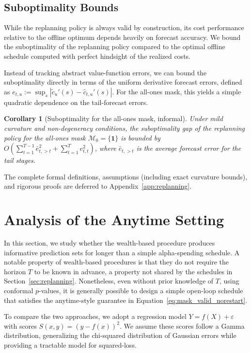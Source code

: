 \documentclass{uai2026} %
\newtheorem{corollary}[theorem]{Corollary}
\newcommand{\1}{\mathbf{1}}
\newcommand{\mcal}{\mathcal{M}}
\begin{document}
\subsection{Suboptimality Bounds}
\label{sec:suboptimality}

While the replanning policy is always valid by construction, its cost performance relative to the offline optimum depends heavily on forecast accuracy.
We bound the suboptimality of the replanning policy compared to the optimal offline schedule computed with perfect hindsight of the realized costs.

Instead of tracking abstract value-function errors, we can bound the suboptimality directly in terms of the uniform derivative forecast errors, defined as $e_{t,u} := \sup_{s} |\tilde{c}_u'(s) - \hat{c}_{t,u}'(s)|$.
For the all-ones mask, this yields a simple quadratic dependence on the tail-forecast errors.

\begin{corollary}[Suboptimality for the all-ones mask, informal]
  \label{cor:regret-allones-informal}
  Under mild curvature and non-degeneracy conditions, the suboptimality gap of the replanning policy for the all-ones mask $\mcal_0 = \{\1\}$ is bounded by $O\left( \sum_{t=1}^{T-1} \bar{e}_{t,>t}^2 + \sum_{t=1}^{T} e_{t,t}^2 \right)$, where $\bar{e}_{t,>t}$ is the average forecast error for the tail stages.
\end{corollary}

The complete formal definitions, assumptions (including exact curvature bounds), and rigorous proofs are deferred to Appendix~\ref{app:replanning}.



\section{Analysis of the Anytime Setting}
\label{sec:ville}

In this section, we study whether the wealth-based procedure produces informative prediction sets for longer than a simple alpha-spending schedule.
A notable property of wealth-based procedures is that they do not require the horizon $T$ to be known in advance, a property not shared by the schedules in Section~\ref{sec:replanning}.
Nonetheless, even without prior knowledge of $T$, using conformal $p$-values, it is generally possible to design a simple open-loop schedule that satisfies the anytime-style guarantee in Equation~\eqref{eq:mask_valid_norestart}.

To compare the two approaches, we adopt a regression model $Y = f(X) + \varepsilon$ with scores $S(x, y) = (y - f(x))^2$. We assume these scores follow a Gamma distribution, generalizing the chi-squared distribution of Gaussian errors while providing a tractable model for squared-loss.
\end{document}
